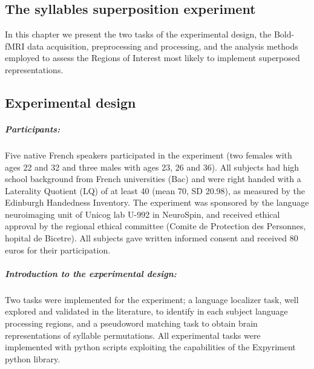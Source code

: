 \begin{fullwidth}
\chapter{\label{ch:super_methods}
The syllables superposition experiment}
\end{fullwidth}

\begin{chabstract}

In this chapter we present the two tasks of the experimental design, the Bold-fMRI data acquisition, preprocessing and processing, and the analysis methods employed to assess the Regions of Interest most likely to implement superposed representations.

\end{chabstract}

\section{Experimental design}

\paragraph{Participants:}
Five native French speakers participated in the experiment (two females with ages 22 and 32 and three males with ages 23, 26 and 36).
All subjects had high school background from French universities (Bac) and were right handed with a Laterality Quotient (LQ) of at least 40 (mean 70, SD 20.98), as measured by the Edinburgh Handedness Inventory\citep{oldfield1971assessment}.
The experiment was sponsored by the language neuroimaging unit of Unicog lab U-992 in NeuroSpin, and received ethical approval by the regional ethical committee (Comite de Protection des Personnes, hopital de Bicetre).
All subjects gave written informed consent and received 80 euros for their participation.

\paragraph{Introduction to the experimental design:}

Two tasks were implemented for the experiment;
a language localizer task, well explored and validated in the literature\citep{mahowald2016reliable}, to identify in each subject language processing regions, and a pseudoword matching task to obtain brain representations of syllable permutations.
All experimental tasks were implemented with python scripts exploiting the capabilities of the Expyriment python library\citep{krause2014expyriment}.

